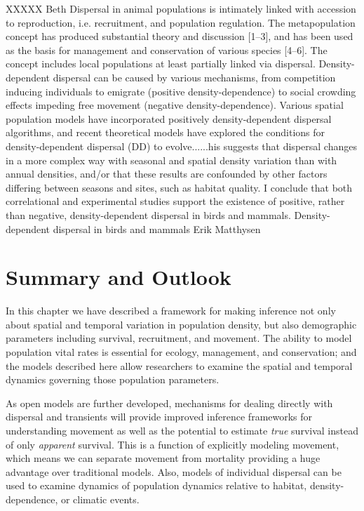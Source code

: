 XXXXX Beth 
Dispersal in animal populations is intimately linked with accession to reproduction, i.e. recruitment, and population regulation. The metapopulation concept has produced substantial theory and discussion [1–3], and has been used as the basis for management and conservation of various species [4–6]. The concept includes local populations at least partially linked via dispersal.
Density-dependent dispersal can be caused by various mechanisms, from competition inducing individuals to emigrate (positive density-dependence) to social crowding effects impeding free movement (negative density-dependence). Various spatial population models have incorporated positively density-dependent dispersal algorithms, and recent theoretical models have explored the conditions for density-dependent dispersal (DD) to evolve......his suggests that dispersal changes in a more complex way with seasonal and spatial density variation than with annual densities, and/or that these results are confounded by other factors differing between seasons and sites, such as habitat quality. I conclude that both correlational and experimental studies support the existence of positive, rather than negative, density-dependent dispersal in birds and mammals.  Density-dependent dispersal in birds and mammals  Erik Matthysen


\section{Summary and Outlook}

In this chapter we have described a framework for making inference not only about
spatial and temporal variation in population density, but also demographic
parameters including survival, recruitment, and movement. The ability to
model population vital rates is essential for ecology, management, and
conservation;
and the models described here allow researchers to examine the spatial
and temporal dynamics governing those population parameters.

As open models are further developed, mechanisms for dealing directly with
dispersal and transients will provide improved inference frameworks for
understanding movement as well as the potential to estimate {\it true} survival instead
of only {\it apparent} survival.
This is a function of explicitly modeling movement, which means we can
separate movement from mortality providing a huge advantage over traditional models.  Also,
models of individual dispersal can be used to examine dynamics of population dynamics relative
to habitat, density-dependence, or climatic events.

